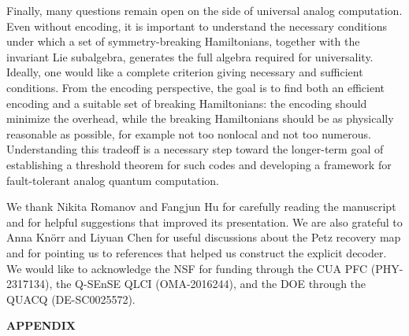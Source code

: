 \documentclass[10pt,twocolumn,superscriptaddress,aps,amsmath,amssymb,citeautoscript,floatfix,prx]{revtex4-2}
\newcounter{alg}
\theoremstyle{plain}
\theoremstyle{plain}
\theoremstyle{plain}
\theoremstyle{plain}
\theoremstyle{plain}
\theoremstyle{plain}
\theoremstyle{plain}
\theoremstyle{definition}
\theoremstyle{plain}
\begin{document}
Finally, many questions remain open on the side of universal analog computation. Even without encoding, it is important to understand the necessary conditions under which a set of 
symmetry-breaking Hamiltonians, together with the invariant Lie subalgebra, generates the full algebra required for universality. 
Ideally, one would like a complete criterion giving necessary and sufficient conditions. From the encoding perspective, the goal is to find both an efficient encoding 
and a suitable set of breaking Hamiltonians: the encoding should minimize the overhead, while the breaking Hamiltonians should be as physically reasonable as possible, 
for example not too nonlocal and not too numerous. Understanding this tradeoff is a necessary step toward the longer-term goal of establishing a threshold theorem for such codes 
and developing a framework for fault-tolerant analog quantum computation.
 
\begin{acknowledgments}
We thank Nikita Romanov and Fangjun Hu for carefully reading the manuscript and for helpful suggestions that improved its presentation. We are also grateful to Anna Knörr and Liyuan Chen for useful discussions about the Petz recovery map and for pointing us to references that helped us construct the explicit decoder. We would like to acknowledge the NSF for funding through the CUA PFC (PHY-2317134), the Q-SEnSE QLCI (OMA-2016244), and the DOE through the QUACQ (DE-SC0025572).
\end{acknowledgments}
 
\nocite{KretschmannSchlingemannWerner2008}
\nocite{Macdonald1995}
\nocite{Robbins1955}
\nocite{LarsenShalev2008}


\let\addcontentsline\oldaddcontentsline

\clearpage
\onecolumngrid


\begin{center}
{\LARGE\bfseries APPENDIX}
\end{center}
\vspace{1em}

\tableofcontents
\clearpage
\end{document}
